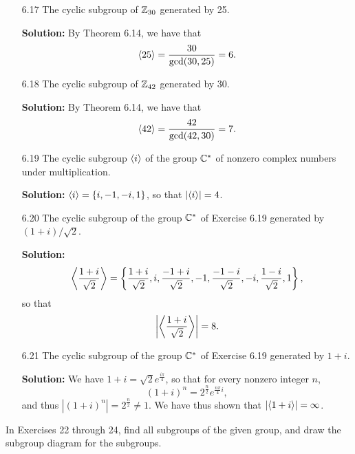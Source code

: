 \begin{enumerate}
   \item[6.17] The cyclic subgroup of $\mathbb{Z}_{30}$ generated by 25.

      \textbf{Solution:} By Theorem 6.14, we have that
      $$\langle 25 \rangle = \frac{30}{\gcd(30, 25)} = 6.$$
   \item[6.18] The cyclic subgroup of $\mathbb{Z}_{42}$ generated by 30.

      \textbf{Solution:} By Theorem 6.14, we have that
      $$\langle 42 \rangle = \frac{42}{\gcd(42, 30)} = 7.$$
   \item[6.19] The cyclic subgroup $\langle i \rangle$ of the group $\mathbb{C}^*$ of nonzero
               complex numbers under multiplication.

      \textbf{Solution:} $\langle i \rangle = \{i, -1, -i, 1\}$, so that $|\langle i \rangle| = 4$.
   \item[6.20] The cyclic subgroup of the group $\mathbb{C}^*$ of Exercise 6.19
               generated by $(1 + i)/\sqrt{2}$.

      \textbf{Solution:}
      $$\left\langle \frac{1 + i}{\sqrt{2}}\right \rangle = \left\{\frac{1 + i}{\sqrt{2}},
        i, \frac{-1 + i}{\sqrt{2}}, -1, \frac{-1 - i}{\sqrt{2}}, -i,
        \frac{1 - i}{\sqrt{2}}, 1\right\},$$
      so that
      $$\left|\left\langle \frac{1 + i}{\sqrt{2}}\right \rangle\right| = 8.$$
   \item[6.21] The cyclic subgroup of the group $\mathbb{C}^*$ of Exercise 6.19
               generated by $1 + i$.

      \textbf{Solution:} We have $1 + i = \sqrt{2}e^{\frac{i\pi}{4}}$, so that
      for every nonzero integer $n$,
      $$(1 + i)^n = 2^{\frac{n}{2}}e^{\frac{n\pi}{4}i},$$
      and thus $|(1 + i)^n| = 2^{\frac{n}{2}} \neq 1$. We have thus shown that
      $|\langle 1 + i \rangle| = \infty$.
      
   
\end{enumerate}

\noindent      In Exercises 22 through 24, find all subgroups of the given
               group, and draw the subgroup diagram for the subgroups.

